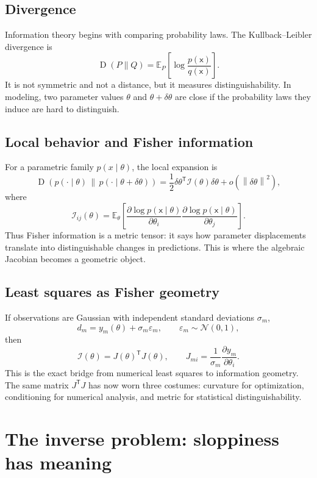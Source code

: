 \documentclass[a4paper]{article}
\DeclareMathOperator{\KL}{D}
\newcommand{\E}{\mathbb{E}}
\newcommand{\pd}[2]{\frac{\partial #1}{\partial #2}}
\newcommand{\rv}[1]{\mathsf{#1}}
\newcommand{\param}{\theta}
\newcommand{\fim}{\mathcal{I}}
\newcommand{\eps}{\varepsilon}
\newcommand{\norm}[1]{\left\lVert #1\right\rVert}
\newcommand{\transpose}{\mathsf{T}}
\newcommand{\jac}{J}
\begin{document}
\subsection{Divergence}

Information theory begins with comparing probability laws.  The Kullback--Leibler divergence is
\[
  \KL(P\|Q)
  =
  \E_P\left[\log\frac{p(\rv{x})}{q(\rv{x})}\right].
\]
It is not symmetric and not a distance, but it measures distinguishability.  In modeling, two parameter values \(\param\) and \(\param+\delta\param\) are close if the probability laws they induce are hard to distinguish.

\subsection{Local behavior and Fisher information}

For a parametric family \(p(x\mid\param)\), the local expansion is
\[
  \KL\!\left(p(\cdot\mid\param)\,\middle\|\,p(\cdot\mid\param+\delta\param)\right)
  =
  \frac{1}{2}
  \delta\param^{\transpose}
  \fim(\param)
  \delta\param
  +
  o(\norm{\delta\param}^2),
\]
where
\[
  \fim_{ij}(\param)
  =
  \E_\param\left[
    \pd{\log p(\rv{x}\mid\param)}{\theta_i}
    \pd{\log p(\rv{x}\mid\param)}{\theta_j}
  \right].
\]
Thus Fisher information is a metric tensor: it says how parameter displacements translate into distinguishable changes in predictions.  This is where the algebraic Jacobian becomes a geometric object.

\subsection{Least squares as Fisher geometry}

If observations are Gaussian with independent standard deviations \(\sigma_m\),
\[
  d_m=y_m(\param)+\sigma_m\eps_m,
  \qquad
  \eps_m\sim\mathcal{N}(0,1),
\]
then
\[
  \fim(\param)=\jac(\param)^{\transpose}\jac(\param),
  \qquad
  J_{mi}=\frac{1}{\sigma_m}\pd{y_m}{\theta_i}.
\]
This is the exact bridge from numerical least squares to information geometry.  The same matrix \(\jac^{\transpose}\jac\) has now worn three costumes: curvature for optimization, conditioning for numerical analysis, and metric for statistical distinguishability.

\section{The inverse problem: sloppiness has meaning}
\end{document}
